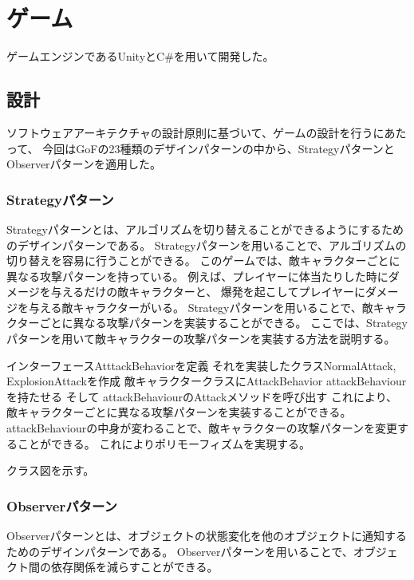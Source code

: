 \documentclass[dvipdfmx,fleqn,article]{jlreq}
\begin{document}
\section{ゲーム}
ゲームエンジンであるUnityとC\#を用いて開発した。

\subsection{設計}
ソフトウェアアーキテクチャの設計原則に基づいて、ゲームの設計を行うにあたって、
今回はGoFの23種類のデザインパターンの中から、StrategyパターンとObserverパターンを適用した。
\subsubsection{Strategyパターン}
Strategyパターンとは、アルゴリズムを切り替えることができるようにするためのデザインパターンである。
Strategyパターンを用いることで、アルゴリズムの切り替えを容易に行うことができる。
このゲームでは、敵キャラクターごとに異なる攻撃パターンを持っている。
例えば、プレイヤーに体当たりした時にダメージを与えるだけの敵キャラクターと、
爆発を起こしてプレイヤーにダメージを与える敵キャラクターがいる。
Strategyパターンを用いることで、敵キャラクターごとに異なる攻撃パターンを実装することができる。
ここでは、Strategyパターンを用いて敵キャラクターの攻撃パターンを実装する方法を説明する。

インターフェースAtttackBehaviorを定義
それを実装したクラスNormalAttack, ExplosionAttackを作成
敵キャラクタークラスにAttackBehavior attackBehaviourを持たせる
そして attackBehaviourのAttackメソッドを呼び出す
これにより、敵キャラクターごとに異なる攻撃パターンを実装することができる。
attackBehaviourの中身が変わることで、敵キャラクターの攻撃パターンを変更することができる。
これによりポリモーフィズムを実現する。

クラス図を示す。


\subsubsection{Observerパターン}
Observerパターンとは、オブジェクトの状態変化を他のオブジェクトに通知するためのデザインパターンである。
Observerパターンを用いることで、オブジェクト間の依存関係を減らすことができる。
\end{document}
